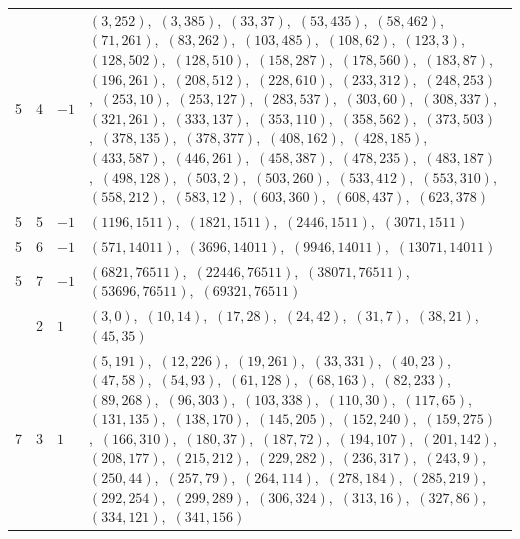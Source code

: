 \documentclass[11pt]{article}
\begin{document}
\begin{longtable}{@{}rrl>{\raggedright\arraybackslash}p{}@{}}
5 & 4 & $-1$ & $(3,252)$,\allowbreak\ $(3,385)$,\allowbreak\ $(33,37)$,\allowbreak\ $(53,435)$,\allowbreak\ $(58,462)$,\allowbreak\ $(71,261)$,\allowbreak\ $(83,262)$,\allowbreak\ $(103,485)$,\allowbreak\ $(108,62)$,\allowbreak\ $(123,3)$,\allowbreak\ $(128,502)$,\allowbreak\ $(128,510)$,\allowbreak\ $(158,287)$,\allowbreak\ $(178,560)$,\allowbreak\ $(183,87)$,\allowbreak\ $(196,261)$,\allowbreak\ $(208,512)$,\allowbreak\ $(228,610)$,\allowbreak\ $(233,312)$,\allowbreak\ $(248,253)$,\allowbreak\ $(253,10)$,\allowbreak\ $(253,127)$,\allowbreak\ $(283,537)$,\allowbreak\ $(303,60)$,\allowbreak\ $(308,337)$,\allowbreak\ $(321,261)$,\allowbreak\ $(333,137)$,\allowbreak\ $(353,110)$,\allowbreak\ $(358,562)$,\allowbreak\ $(373,503)$,\allowbreak\ $(378,135)$,\allowbreak\ $(378,377)$,\allowbreak\ $(408,162)$,\allowbreak\ $(428,185)$,\allowbreak\ $(433,587)$,\allowbreak\ $(446,261)$,\allowbreak\ $(458,387)$,\allowbreak\ $(478,235)$,\allowbreak\ $(483,187)$,\allowbreak\ $(498,128)$,\allowbreak\ $(503,2)$,\allowbreak\ $(503,260)$,\allowbreak\ $(533,412)$,\allowbreak\ $(553,310)$,\allowbreak\ $(558,212)$,\allowbreak\ $(583,12)$,\allowbreak\ $(603,360)$,\allowbreak\ $(608,437)$,\allowbreak\ $(623,378)$\\
5 & 5 & $-1$ & $(1196,1511)$,\allowbreak\ $(1821,1511)$,\allowbreak\ $(2446,1511)$,\allowbreak\ $(3071,1511)$\\
5 & 6 & $-1$ & $(571,14011)$,\allowbreak\ $(3696,14011)$,\allowbreak\ $(9946,14011)$,\allowbreak\ $(13071,14011)$\\
5 & 7 & $-1$ & $(6821,76511)$,\allowbreak\ $(22446,76511)$,\allowbreak\ $(38071,76511)$,\allowbreak\ $(53696,76511)$,\allowbreak\ $(69321,76511)$\\
\addlinespace[3pt]
7 & 2 & $1$ & $(3,0)$,\allowbreak\ $(10,14)$,\allowbreak\ $(17,28)$,\allowbreak\ $(24,42)$,\allowbreak\ $(31,7)$,\allowbreak\ $(38,21)$,\allowbreak\ $(45,35)$\\
7 & 3 & $1$ & $(5,191)$,\allowbreak\ $(12,226)$,\allowbreak\ $(19,261)$,\allowbreak\ $(33,331)$,\allowbreak\ $(40,23)$,\allowbreak\ $(47,58)$,\allowbreak\ $(54,93)$,\allowbreak\ $(61,128)$,\allowbreak\ $(68,163)$,\allowbreak\ $(82,233)$,\allowbreak\ $(89,268)$,\allowbreak\ $(96,303)$,\allowbreak\ $(103,338)$,\allowbreak\ $(110,30)$,\allowbreak\ $(117,65)$,\allowbreak\ $(131,135)$,\allowbreak\ $(138,170)$,\allowbreak\ $(145,205)$,\allowbreak\ $(152,240)$,\allowbreak\ $(159,275)$,\allowbreak\ $(166,310)$,\allowbreak\ $(180,37)$,\allowbreak\ $(187,72)$,\allowbreak\ $(194,107)$,\allowbreak\ $(201,142)$,\allowbreak\ $(208,177)$,\allowbreak\ $(215,212)$,\allowbreak\ $(229,282)$,\allowbreak\ $(236,317)$,\allowbreak\ $(243,9)$,\allowbreak\ $(250,44)$,\allowbreak\ $(257,79)$,\allowbreak\ $(264,114)$,\allowbreak\ $(278,184)$,\allowbreak\ $(285,219)$,\allowbreak\ $(292,254)$,\allowbreak\ $(299,289)$,\allowbreak\ $(306,324)$,\allowbreak\ $(313,16)$,\allowbreak\ $(327,86)$,\allowbreak\ $(334,121)$,\allowbreak\ $(341,156)$\\

\end{longtable}
\end{document}
